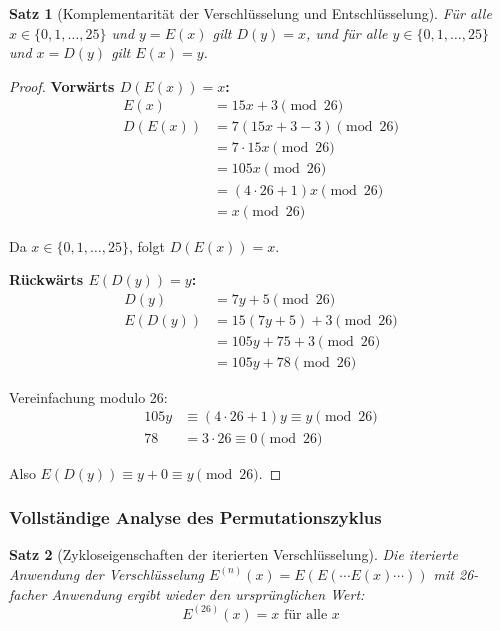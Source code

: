 ﻿\documentclass[12pt,a4paper]{article}
\newtheorem{theorem}{Satz}
\begin{document}
	\begin{theorem}[Komplementarität der Verschlüsselung und Entschlüsselung]
		Für alle $x \in \{0, 1, \ldots, 25\}$ und $y = E(x)$ gilt $D(y) = x$, und für alle $y \in \{0, 1, \ldots, 25\}$ und $x = D(y)$ gilt $E(x) = y$.
	\end{theorem}
	
	\begin{proof}
		\textbf{Vorwärts $D(E(x)) = x$:}
		\begin{align}
			E(x) &= 15x + 3 \pmod{26} \\
			D(E(x)) &= 7(15x + 3 - 3) \pmod{26} \\
			&= 7 \cdot 15x \pmod{26} \\
			&= 105x \pmod{26} \\
			&= (4 \cdot 26 + 1)x \pmod{26} \\
			&= x \pmod{26}
		\end{align}
		
		Da $x \in \{0, 1, \ldots, 25\}$, folgt $D(E(x)) = x$. \checkmark
		
		\textbf{Rückwärts $E(D(y)) = y$:}
		\begin{align}
			D(y) &= 7y + 5 \pmod{26} \\
			E(D(y)) &= 15(7y + 5) + 3 \pmod{26} \\
			&= 105y + 75 + 3 \pmod{26} \\
			&= 105y + 78 \pmod{26}
		\end{align}
		
		Vereinfachung modulo 26:
		\begin{align}
			105y &\equiv (4 \cdot 26 + 1)y \equiv y \pmod{26} \\
			78 &= 3 \cdot 26 \equiv 0 \pmod{26}
		\end{align}
		
		Also $E(D(y)) \equiv y + 0 \equiv y \pmod{26}$. \checkmark
	\end{proof}
	
	\subsubsection{Vollständige Analyse des Permutationszyklus}
	
	\begin{theorem}[Zykloseigenschaften der iterierten Verschlüsselung]
		Die iterierte Anwendung der Verschlüsselung $E^{(n)}(x) = E(E(\cdots E(x) \cdots))$ mit 26-facher Anwendung ergibt wieder den ursprünglichen Wert:
		\begin{equation}
			E^{(26)}(x) = x \text{ für alle } x
		\end{equation}
	\end{theorem}
	
\end{document}
